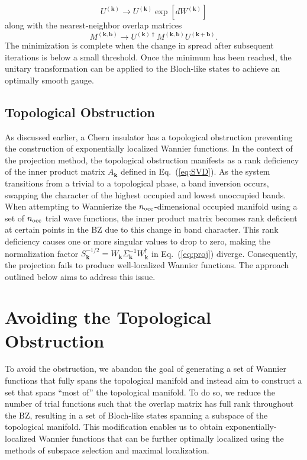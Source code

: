 \documentclass[galley,aps,pra,10pt,amsmath,amssymb,
    superscriptaddress,nofootinbib,longbibliography]{revtex4-2}
\def\Red#1{\textcolor{red}{#1}}
\newcounter{comm}
\newcommand{\seclab}[1]{\label{sec:#1}{\Red{\small\;\;[sec:~#1]}}}
\newcommand{\seclab}[1]{\label{sec:#1}}
\newcommand{\eq}[1]{Eq.~(\ref{eq:#1})}
\begin{document}
\begin{equation}
    U^{(\mathbf{k})} \rightarrow U^{(\mathbf{k})} \exp\left[ dW^{(\mathbf{k})} \right]
\end{equation}
along with the nearest-neighbor overlap matrices 
\begin{equation}
    M^{(\mathbf{k}, \mathbf{b})} \rightarrow U^{(\mathbf{k})\dagger} M^{(\mathbf{k}, \mathbf{b})} U^{(\mathbf{k} + \mathbf{b})} .
\end{equation}
The minimization is complete when the change in spread after subsequent iterations is below a small threshold. Once the minimum has been reached, the unitary transformation can be applied to the Bloch-like states to achieve an optimally smooth gauge.


\subsection{Topological Obstruction}

As discussed earlier, a Chern insulator has a topological obstruction preventing the construction of exponentially localized Wannier functions. In the context of the projection method, the topological obstruction manifests as a rank deficiency of the inner product matrix $A_{\mathbf{k}}$ defined in \eq{SVD}. As the system transitions from a trivial to a topological phase, a band inversion occurs, swapping the character of the highest occupied and lowest unoccupied bands. When attempting to Wannierize the $n_{\rm occ}$-dimensional occupied manifold using a set of $n_{\rm occ}$ trial wave functions, the inner product matrix becomes rank deficient at certain points in the BZ due to this change in band character. This rank deficiency causes one or more singular values to drop to zero, making the normalization factor $S_{\mathbf{k}}^{-1/2} = W_{\mathbf{k}} \Sigma_{\mathbf{k}}^{-1} W_{\mathbf{k}}^{\dagger}$ in \eq{proj} diverge. Consequently, the projection fails to produce well-localized Wannier functions. The approach outlined below aims to address this issue.

\section{Avoiding the Topological Obstruction}
\seclab{avoid-topo}

To avoid the obstruction, we abandon the goal of generating a set of Wannier functions that fully spans the topological manifold and instead aim to construct a set that spans ``most of'' the topological manifold. To do so, we reduce the number of trial functions such that the overlap matrix has full rank throughout the BZ, resulting in a set of Bloch-like states spanning a subspace of the topological manifold. This modification enables us to obtain exponentially-localized Wannier functions that can be further optimally localized using the methods of subspace selection and maximal localization.
\end{document}
